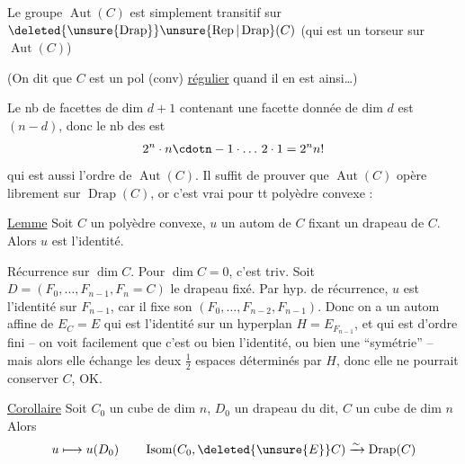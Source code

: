 \uline{} Le groupe $\operatorname{Aut}(C)$ est simplement transitif sur $\deleted{\unsure{\operatorname{Drap}}}\unsure{\operatorname{Rep}|\operatorname{Drap}}(C)$ (qui est  un torseur  sur $\operatorname{Aut}(C)$)

(On dit que $C$ est un pol (conv) \uline{régulier} quand il   en est ainsi\ldots)

Le nb de facettes de dim $d+1$ contenant une facette donnée de dim $d$ est  $(n-d)$, donc le nb des   est
\[
2^n\cdot n\cdotn-1\cdot\ldots\,2\cdot1=2^n n!
\]
qui est aussi l'ordre de $\operatorname{Aut}(C)$. Il suffit de prouver que $\operatorname{Aut}(C)$ opère librement sur $\operatorname{Drap}(C)$, or c'est vrai pour tt polyèdre convexe :

\uline{Lemme} Soit $C$ un polyèdre convexe, $u$ un autom de $C$ fixant un drapeau de $C$. Alors $u$ est l'identité.

Récurrence sur $\dim C$. Pour $\dim C=0$, c'est triv. Soit $D=(F_0,\ldots,F_{n-1},F_n=C)$ le drapeau fixé. Par hyp. de récurrence, $u$ est l'identité sur $F_{n-1}$, car il fixe son   $(F_0,\ldots,F_{n-2},F_{n-1})$. Donc on a un autom  affine de $E_C=E$ qui est l'identité sur un hyperplan $H=E_{F_{n-1}}$, et qui est d'ordre fini -- on voit facilement que c'est ou bien l'identité, ou bien une ``symétrie'' -- mais alors elle échange les deux $\frac12$ espaces déterminés par $H$, donc elle ne pourrait conserver $C$, OK.


\uline{Corollaire} Soit $C_0$ un cube de dim $n$, $D_0$ un drapeau du dit,  $C$ un cube de dim $n$ Alors
\[
u\longmapsto u(D_0)\qquad\operatorname{Isom}(C_0,\deleted{\unsure{E}}C)\xrightarrow{\sim}\operatorname{Drap}(C)
\]
